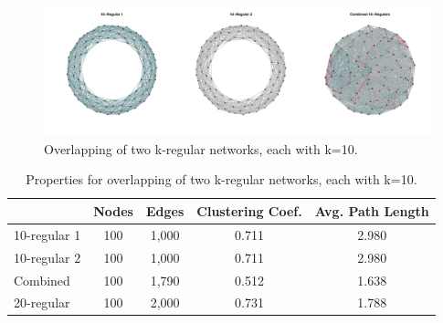 \documentclass[preprint,number]{elsarticle}
\begin{document}
\begin{figure}
	\centering
	\includegraphics[width=1\linewidth]{"../analysis/pdf/network_properties_merge_2_10regular"}
	\begin{minipage}{0.9\textwidth}
		\caption{Overlapping of two k-regular networks, each with k=10.}
		\label{fig:network_properties_merge_2_10regular}
	\end{minipage}
\end{figure}

\begin{table}
	\centering
	\begin{minipage}{0.9\textwidth}
		\caption{Properties for overlapping of two k-regular networks, each with k=10.}
		\label{tab:network_properties_merge_2_10regular}
	\end{minipage}
	\begin{tabular}{lcccc}
		& Nodes &  Edges & Clustering Coef.	  &  Avg. Path Length \\ 
		\hline  10-regular 1 & 100 &  1,000  &  0.711 &  2.980 \\ 
		\hline  10-regular 2 & 100 & 1,000 & 0.711 &  2.980 \\ 
		\hline  Combined & 100 & 1,790  & 0.512 &  1.638 \\ 
		\hline 20-regular & 100 & 2,000	& 0.731	& 1.788 \\
		\hline 
	\end{tabular} 
\end{table}
\end{document}
